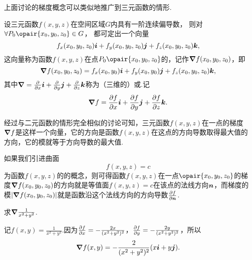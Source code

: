 上面讨论的梯度概念可以类似地推广到三元函数的情形.
\begin{definition}
设三元函数\(f(x,y,z)\)在空间区域\(G\)内具有一阶连续偏导数，
则对\(\forall P_0\opair{x_0,y_0,z_0} \in G\)，
都可定出一个向量\[
f_x(x_0,y_0,z_0) \boldsymbol{i} + f_y(x_0,y_0,z_0) \boldsymbol{j} + f_z(x_0,y_0,z_0) \boldsymbol{k},
\]这向量称为函数\(f(x,y,z)\)在点\(P_0\opair{x_0,y_0,z_0}\)的，记作\(\grad{f}(x_0,y_0,z_0)\)，即\[
\grad{f}(x_0,y_0,z_0)
= f_x(x_0,y_0) \boldsymbol{i} + f_y(x_0,y_0) \boldsymbol{j} + f_z(x_0,y_0,z_0) \boldsymbol{k},
\]其中\(\grad = \pdv{x} \boldsymbol{i} + \pdv{y} \boldsymbol{j} + \pdv{z} \boldsymbol{k}\)称为（三维的）或.记\[
\grad{f} = \pdv{f}{x} \boldsymbol{i} + \pdv{f}{y} \boldsymbol{j} + \pdv{f}{z} \boldsymbol{k}.
\]
\end{definition}

经过与二元函数的情形完全相似的讨论可知，三元函数\(f(x,y,z)\)在一点的梯度\(\grad{f}\)是这样一个向量，它的方向是函数\(f(x,y,z)\)在这点的方向导数取得最大值的方向，它的模就等于方向导数的最大值.

如果我们引进曲面\[
f(x,y,z) = c
\]为函数\(f(x,y,z)\)的的概念，则可得函数\(f(x,y,z)\)在一点\(\opair{x_0,y_0,z_0}\)的梯度\(\grad f(x_0,y_0,z_0)\)的方向就是等值面\(f(x,y,z) = c\)在该点的法线方向\(\boldsymbol{n}\)，而梯度的模\(\abs{\grad f(x_0,y_0,z_0)}\)就是函数沿这个法线方向的方向导数\(\pdv{f}{\boldsymbol{n}}\).

\begin{example}
求\(\grad \frac{1}{x^2+y^2}\).
\begin{solution}
记\(f(x,y) = \frac{1}{x^2+y^2}\).因为\(\pdv{f}{x} = -\frac{2x}{(x^2+y^2)^2}\)，\(\pdv{f}{y} = -\frac{2y}{(x^2+y^2)^2}\)，所以\[
\grad f(x,y) = -\frac{2}{(x^2+y^2)^2} (x \boldsymbol{i} + y \boldsymbol{j}).
\]
\end{solution}
\end{example}

